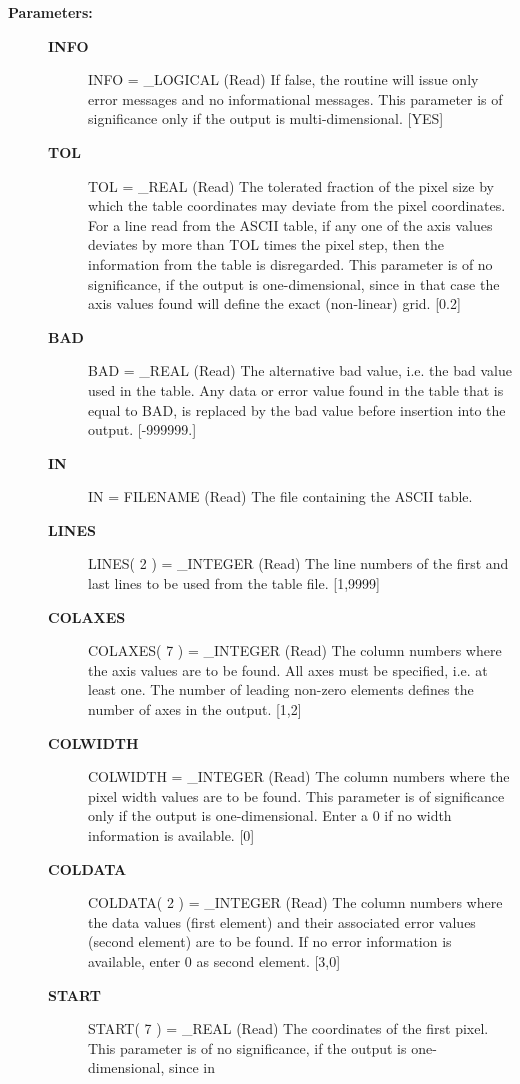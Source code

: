 \begin{description}
\item [{\bf Parameters:}]
\begin{description}
\item [{\bf INFO}]
INFO = _LOGICAL (Read)
   If false, the routine will issue only error messages and no
   informational messages. This parameter is of significance only
   if the output is multi-dimensional. [YES]
\item [{\bf TOL}]
TOL = _REAL (Read)
   The tolerated fraction of the pixel size by which the table
   coordinates may deviate from the pixel coordinates. For a line
   read from the ASCII table, if any one of the axis values
   deviates by more than TOL times the pixel step, then the
   information from the table is disregarded. This parameter is of
   no significance, if the output is one-dimensional, since in
   that case the axis values found will define the exact
   (non-linear) grid. [0.2]
\item [{\bf BAD}]
BAD = _REAL (Read)
   The alternative bad value, i.e. the bad value used in the
   table. Any data or error value found in the table that is equal
   to BAD, is replaced by the bad value before insertion into the
   output. [-999999.]
\item [{\bf IN}]
IN = FILENAME (Read)
   The file containing the ASCII table.
\item [{\bf LINES}]
LINES( 2 ) = _INTEGER (Read)
   The line numbers of the first and last lines to be used from
   the table file. [1,9999]
\item [{\bf COLAXES}]
COLAXES( 7 ) = _INTEGER (Read)
   The column numbers where the axis values are to be found. All
   axes must be specified, i.e. at least one. The number of
   leading non-zero elements defines the number of axes in the
   output. [1,2]
\item [{\bf COLWIDTH}]
COLWIDTH = _INTEGER (Read)
   The column numbers where the pixel width values are to be
   found. This parameter is of significance only if the output is
   one-dimensional. Enter a 0 if no width information is
   available. [0]
\item [{\bf COLDATA}]
COLDATA( 2 ) = _INTEGER (Read)
   The column numbers where the data values (first element) and
   their associated error values (second element) are to be
   found. If no error information is available, enter 0 as second
   element. [3,0]
\item [{\bf START}]
START( 7 ) = _REAL (Read)
   The coordinates of the first pixel. This parameter is of
   no significance, if the output is one-dimensional, since in

\end{description}
\end{description}
